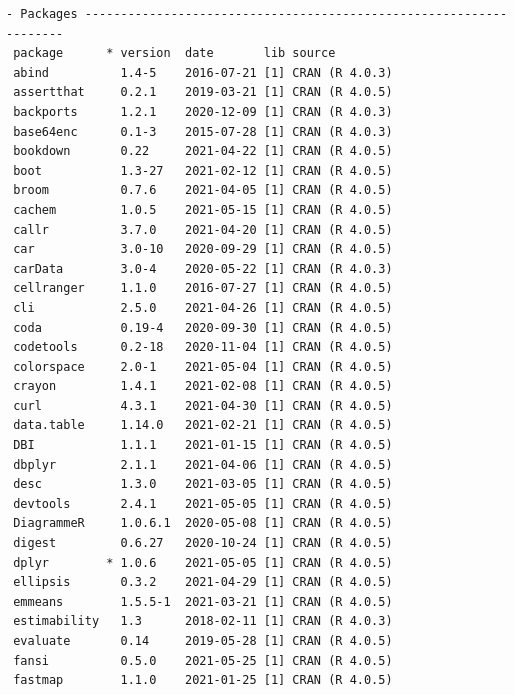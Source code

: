\documentclass [11pt, proquest] {uwthesis}[2015/03/03]
\begin{document}
\begin{verbatim}
- Packages -------------------------------------------------------------------
 package      * version  date       lib source                               
 abind          1.4-5    2016-07-21 [1] CRAN (R 4.0.3)                       
 assertthat     0.2.1    2019-03-21 [1] CRAN (R 4.0.5)                       
 backports      1.2.1    2020-12-09 [1] CRAN (R 4.0.3)                       
 base64enc      0.1-3    2015-07-28 [1] CRAN (R 4.0.3)                       
 bookdown       0.22     2021-04-22 [1] CRAN (R 4.0.5)                       
 boot           1.3-27   2021-02-12 [1] CRAN (R 4.0.5)                       
 broom          0.7.6    2021-04-05 [1] CRAN (R 4.0.5)                       
 cachem         1.0.5    2021-05-15 [1] CRAN (R 4.0.5)                       
 callr          3.7.0    2021-04-20 [1] CRAN (R 4.0.5)                       
 car            3.0-10   2020-09-29 [1] CRAN (R 4.0.5)                       
 carData        3.0-4    2020-05-22 [1] CRAN (R 4.0.3)                       
 cellranger     1.1.0    2016-07-27 [1] CRAN (R 4.0.5)                       
 cli            2.5.0    2021-04-26 [1] CRAN (R 4.0.5)                       
 coda           0.19-4   2020-09-30 [1] CRAN (R 4.0.5)                       
 codetools      0.2-18   2020-11-04 [1] CRAN (R 4.0.5)                       
 colorspace     2.0-1    2021-05-04 [1] CRAN (R 4.0.5)                       
 crayon         1.4.1    2021-02-08 [1] CRAN (R 4.0.5)                       
 curl           4.3.1    2021-04-30 [1] CRAN (R 4.0.5)                       
 data.table     1.14.0   2021-02-21 [1] CRAN (R 4.0.5)                       
 DBI            1.1.1    2021-01-15 [1] CRAN (R 4.0.5)                       
 dbplyr         2.1.1    2021-04-06 [1] CRAN (R 4.0.5)                       
 desc           1.3.0    2021-03-05 [1] CRAN (R 4.0.5)                       
 devtools       2.4.1    2021-05-05 [1] CRAN (R 4.0.5)                       
 DiagrammeR     1.0.6.1  2020-05-08 [1] CRAN (R 4.0.5)                       
 digest         0.6.27   2020-10-24 [1] CRAN (R 4.0.5)                       
 dplyr        * 1.0.6    2021-05-05 [1] CRAN (R 4.0.5)                       
 ellipsis       0.3.2    2021-04-29 [1] CRAN (R 4.0.5)                       
 emmeans        1.5.5-1  2021-03-21 [1] CRAN (R 4.0.5)                       
 estimability   1.3      2018-02-11 [1] CRAN (R 4.0.3)                       
 evaluate       0.14     2019-05-28 [1] CRAN (R 4.0.5)                       
 fansi          0.5.0    2021-05-25 [1] CRAN (R 4.0.5)                       
 fastmap        1.1.0    2021-01-25 [1] CRAN (R 4.0.5)                       

\end{verbatim}
\end{document}
